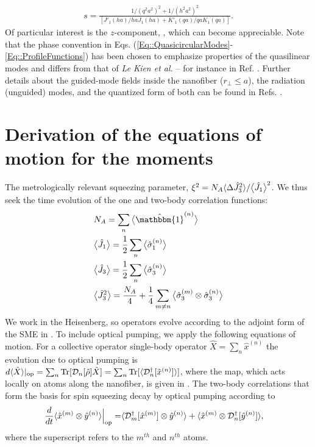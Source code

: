 \documentclass[preprint,aps,pra,onecolumn]{revtex4-1} %
\begin{document}
\begin{appendix}
	\begin{align}
		s = \frac{1/(q^2 a^2)^{2} + 1/(h^2 a^2)^{2}}{[J'_1(ha)/haJ_1(ha) + K'_1(qa)/qaK_1(qa)]}.
	\end{align}  
Of particular interest is the $z$-component, , which can become appreciable.  Note that the phase convention in Eqs. (\ref{Eq::QuasicircularModes}-\ref{Eq::ProfileFunctions}) has been chosen to emphasize properties of the quasilinear modes and differs from that of \emph{Le Kien et al.} -- for instance in Ref. \cite{le_kien_propagation_2014}.  
Further details about the guided-mode fields inside the nanofiber ($r_\perp\leq a$), the radiation (unguided) modes, and the quantized form of both can be found in Refs. \cite{sondergaard_general_2001, tong_single-mode_2004, kien_field_2004, le_kien_spontaneous_2005, Vetsch thesis}.


\section{Derivation of the equations of motion for the moments} \label{Appendix::OpticalPumping}	
The metrologically relevant squeezing parameter, $\xi^2 = N_A \langle{\Delta \hat{J}_3^2}\rangle/\big\langle \hat{J}_1 \big\rangle^2$.  
We thus seek the time evolution of the one and two-body correlation functions:
\begin{align}
&N_A = \sum_n \expect{\hat{\mathbbm{1}}^{(n)}} \\
&\expect{\hat{J}_1} = \frac{1}{2} \sum_n \expect{\hat{\sigma}_1^{(n)}} \\
&\expect{\hat{J}_3} = \frac{1}{2} \sum_n \expect{\hat{\sigma}_3^{(n)}} \\
&\expect{\hat{J}_3^2} = \frac{N_A}{4} +\frac{1}{4} \sum_{m \neq n} \expect{\hat{\sigma}_3^{(m)}\otimes \hat{\sigma}_3^{(n)}} 
\end{align}
We work in the Heisenberg, so operators evolve according to the adjoint form of the SME in . 
To include optical pumping, we apply the following equations of motion. For a collective operator single-body operator $\hat{X} = \sum_n \hat{x}^{(n)}$ the evolution due to optical pumping is $d\langle{ \hat{X}}\rangle|_{\rm op} = \sum_n \mbox{Tr} [\mathcal{D}_n[\hat{\rho}]\hat{X} ] = \sum_n \mbox{Tr} [\langle{\mathcal{D}_n^\dagger[\hat{x}^{(n)}]}\rangle ] $, where the map, which acts locally on atoms along the nanofiber, is given in .  
The two-body correlations that form the basis for spin squeezing decay by optical pumping  according to \cite{baragiola_three-dimensional_2014}
	\begin{align}
		\frac{d}{dt} \langle{ \hat{x}^{(m)} \otimes \hat{y}^{(n)} }\rangle \Big|_{\rm op}= &\langle{ \mathcal{D}_m^\dagger[ \hat{x}^{(m)}] \otimes \hat{y}^{(n)} }\rangle + \langle{ \hat{x}^{(m)}\otimes \mathcal{D}_n^\dagger[ \hat{y}^{(n)}] }\rangle,
	\end{align}
where the superscript refers to the $m^{th}$ and $n^{th}$ atoms. 


\end{appendix}
\end{document}
